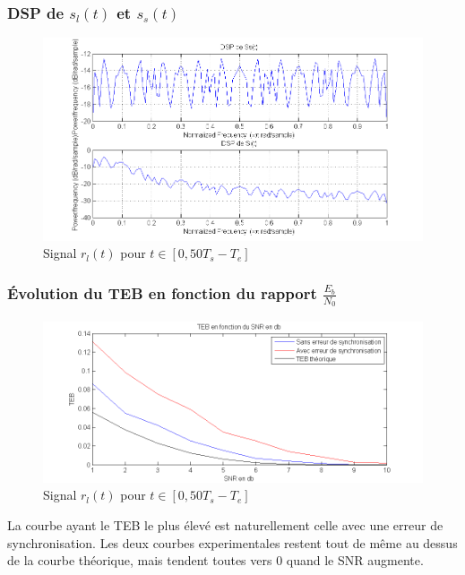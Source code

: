 \documentclass[11pt]{article}
\begin{document}
		\subsubsection{DSP de $s_l(t)$ et $s_s(t)$}
			\begin{figure}[h]
				\centering
				\includegraphics[scale=0.5]{images/Q318-4.png}
				\caption{Signal $r_l(t)$ pour $t \in [0, 50T_s-T_e]$}
				\label{Q318-4}
			\end{figure}
		
		\subsubsection{Évolution du TEB en fonction du rapport $\frac{E_b}{N_0}$}
			\begin{figure}[!ht]
				\centering
				\includegraphics[scale=0.5]{images/Q318-5-6.png}
				\caption{Signal $r_l(t)$ pour $t \in [0, 50T_s-T_e]$}
				\label{Q318-5-6}
			\end{figure}
			La courbe ayant le TEB le plus élevé est naturellement celle avec une erreur de synchronisation. Les deux courbes experimentales restent tout de même au dessus de la courbe théorique, mais tendent toutes vers 0 quand le SNR augmente.		
		
\end{document}
